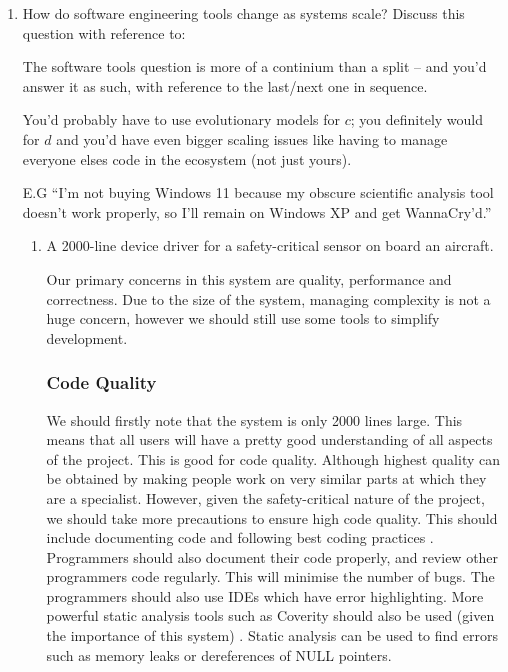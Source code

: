 \documentclass[10pt,\jkfside,a4paper]{article}
\begin{document}
\begin{enumerate}

\item How do software engineering tools change as systems scale?
Discuss this question with reference to:

{\color{blue}
The software tools question is more of a continium than a split -- and you'd answer it as such,
with reference to the last/next one in sequence.

You'd probably have to use
evolutionary models for $c$; you definitely would for $d$ and you'd have even bigger
scaling issues like having to manage everyone elses code in the ecosystem (not just yours).

E.G
``I'm not buying Windows 11 because my obscure scientific analysis tool doesn't work properly, so
I'll remain on Windows XP and get WannaCry'd.''
}

\begin{enumerate}[label=(\alph*)]

\item A 2000-line device driver for a safety-critical sensor on board an aircraft.

Our primary concerns in this system are quality, performance and correctness.
Due to the size of the system, managing complexity is not a huge concern, however
we should still use some tools to simplify development.

\subsubsection*{Code Quality}

We should firstly note that the system is only 2000 lines large.
This means that all users will have a pretty good understanding of all aspects of the project.
This is good for code quality.
Although highest quality can be obtained by making people work on very similar parts at which they are a specialist.
However, given the safety-critical nature of the project, we should take more precautions to ensure high code quality.
This should include documenting code and following best coding practices \dag.
Programmers should also document their code properly, and review other programmers code regularly. This will minimise
the number of bugs. The programmers should also use IDEs which have error highlighting.
More powerful static analysis tools such as Coverity should also be used (given the importance of this system) .
Static analysis can be used to find errors such as memory leaks or dereferences of NULL pointers.


\end{enumerate}
\end{enumerate}
\end{document}
